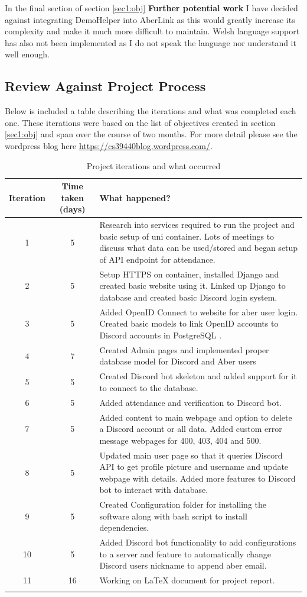 In the final section of section \ref{sec1:obj} \textbf{Further potential work} I have decided against integrating DemoHelper into AberLink as this would greatly increase its complexity and make it much more difficult to maintain. Welsh language support has also not been implemented as I do not speak the language nor understand it well enough.

\subsection{Review Against Project Process}\label{sec3:pp}

Below is included a table describing the iterations and what was completed each one. These iterations were based on the list of objectives created in section \ref{sec1:obj} and span over the course of two months. For more detail please see the wordpress blog here \href{https://cs39440blog.wordpress.com/}{https://cs39440blog.wordpress.com/}.

\begin{longtable}[H]{| c | c | p{9cm} |}
\hline
Iteration & Time taken (days) & What happened? \\
\hline
1 & 5 & Research into services required to run the project and basic setup of uni container. Lots of meetings to discuss what data can be used/stored and began setup of API endpoint for attendance. \\
\hline
2 & 5 & Setup HTTPS on container, installed Django \cite{Django} and created basic website using it. Linked up Django to database and created basic Discord login system. \\
\hline
3 & 5 & Added OpenID Connect \cite{OpenID} to website for aber user login. Created basic models to link OpenID accounts to Discord accounts in PostgreSQL \cite{psql}. \\
\hline
4 & 7 & Created Admin pages and implemented proper database model for Discord and Aber users\\
\hline
5 & 5 & Created Discord bot skeleton and added support for it to connect to the database.\\
\hline
6 & 5 & Added attendance and verification to Discord bot. \\
\hline
7 & 5 & Added content to main webpage and option to delete a Discord account or all data. Added custom error message webpages for 400, 403, 404 and 500. \\
\hline
8 & 5 & Updated main user page so that it queries Discord API to get profile picture and username and update webpage with details. Added more features to Discord bot to interact with database.\\
\hline
9 & 5 & Created Configuration folder for installing the software along with bash script to install dependencies.\\
\hline
10 & 5 & Added Discord bot functionality to add configurations to a server and feature to automatically change Discord users nickname to append aber email.\\
\hline
11 & 16 & Working on LaTeX document for project report. \\
\hline
\caption{Project iterations and what occurred}
\label{tab:project-iterations}
\end{longtable}


